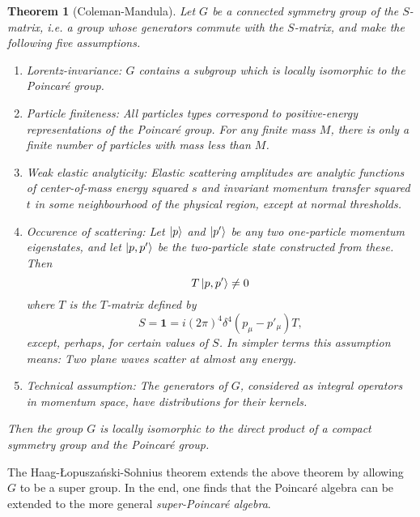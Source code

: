 \documentclass[a4paper,10pt]{scrreprt}
\theoremstyle{definition}
\theoremstyle{plain}
\newtheorem{theorem}{Theorem}[section]
\theoremstyle{remark}
\begin{document}
\begin{theorem}[Coleman-Mandula]
  Let $G$ be a connected symmetry group of the $S$-matrix, i.e. a group whose generators commute with the $S$-matrix, and make the following five assumptions.
  \begin{enumerate}
    \item \emph{Lorentz-invariance:} $G$ contains a subgroup which is locally isomorphic to the Poincar{\'e} group.

    \item \emph{Particle finiteness:} All particles types correspond to positive-energy representations of the Poincar{\'e} group. For any finite mass $M$, there is only a finite number of particles with mass less than $M$.

    \item \emph{Weak elastic analyticity:} Elastic scattering amplitudes are analytic functions of center-of-mass energy squared $s$ and invariant momentum transfer squared $t$ in some neighbourhood of the physical region, except at normal thresholds.

    \item \emph{Occurence of scattering:} Let $\ket{p}$ and $\ket{p'}$ be any two one-particle momentum eigenstates, and let $\ket{p, p'}$ be the two-particle state constructed from these. Then
      \begin{equation*}
        T\ket{p, p'} \neq 0
      \end{equation*}
      where $T$ is the $T$-matrix defined by
      \begin{equation*}
        S = \mathbf{1} = i (2\pi)^{4} \delta^{4}(p_{\mu} - p'_{\mu}) T,
      \end{equation*}
      except, perhaps, for certain values of $S$. In simpler terms this assumption means: Two plane waves scatter at almost any energy.

    \item \emph{Technical assumption:} The generators of $G$, considered as integral operators in momentum space, have distributions for their kernels.
  \end{enumerate}

  Then the group $G$ is locally isomorphic to the direct product of a compact symmetry group and the Poincar{\'e} group.
\end{theorem}

The Haag-{\L}opusza{\'n}ski-Sohnius theorem extends the above theorem by allowing $G$ to be a super group. In the end, one finds that the Poincar{\'e} algebra can be extended to the more general \emph{super-Poincar{\'e} algebra}.
\end{document}
